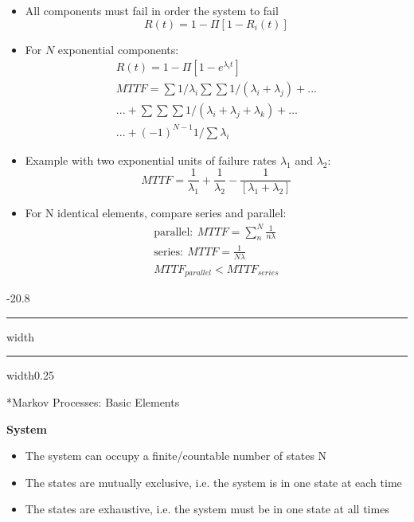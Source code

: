 \documentclass[8pt, landscape, fleqn]{scrartcl}
\makeatletter
\renewcommand{\subsection}{\@startsection{subsection}{1}{0mm}%
{-2\baselineskip}{0.8\baselineskip}%
{\hrule depth 0.2pt width\columnwidth\hrule depth0.75pt
width0.25\columnwidth\vspace*{1.2em}\large\bfseries\rmfamily}}
\makeatother
\begin{document}
\begin{multicols*}{3}
\begin{itemize}
    \item All components must fail in order the system to fail
    \begin{equation}
        R(t) = 1 - \Pi \left[1- R_i(t)\right]
    \end{equation}
    \item For $N$ exponential components:
    \begin{align}
        R(t) = 1- \Pi \left[1 - e^{\lambda_i t}\right] \\
        MTTF = \sum 1/\lambda_i \sum \sum 1/(\lambda_i +\lambda_j) + ... \\
        ...+\sum \sum \sum 1/(\lambda_i +\lambda_j +\lambda_k) + ... \\ 
        ...+ (-1)^{N-1} 1/\sum\lambda_i
    \end{align}
    \item Example with two exponential units of failure rates $\lambda_1$ and $\lambda_2$:
    \begin{equation}
        MTTF = \frac{1}{\lambda_1} + \frac{1}{\lambda_2} - \frac{1}{[\lambda_1 + \lambda_2]}
    \end{equation}
    \item For N identical elements, compare series and parallel:
    \begin{align}
        \text{parallel}:~ MTTF = \sum_n^N \frac{1}{n\lambda} \\
        \text{series}: ~ MTTF = \frac{1}{N\lambda} \\ 
        MTTF_{parallel} < MTTF_{series}
    \end{align}
\end{itemize}


\subsection*{Markov Processes: Basic Elements}

\textbf{System}

\begin{itemize}
    \item The system can occupy a finite/countable number of states N
    \item The states are mutually exclusive, i.e. the system is in one state at each time 
    \item The states are exhaustive, i.e. the system must be in one state at all times 
\end{itemize}


\end{multicols*}
\end{document}
